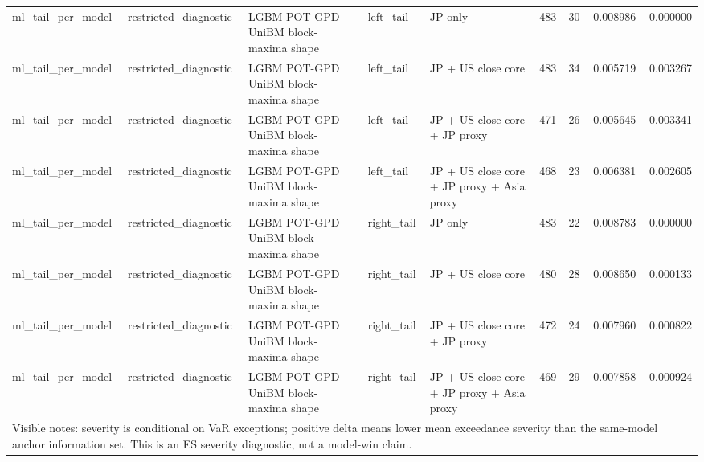 \begin{tabular}{lllllrrrr}
ml\_tail\_per\_model & restricted\_diagnostic & LGBM POT-GPD UniBM block-maxima shape & left\_tail & JP only & 483 & 30 & 0.008986 & 0.000000 \\
ml\_tail\_per\_model & restricted\_diagnostic & LGBM POT-GPD UniBM block-maxima shape & left\_tail & JP + US close core & 483 & 34 & 0.005719 & 0.003267 \\
ml\_tail\_per\_model & restricted\_diagnostic & LGBM POT-GPD UniBM block-maxima shape & left\_tail & JP + US close core + JP proxy & 471 & 26 & 0.005645 & 0.003341 \\
ml\_tail\_per\_model & restricted\_diagnostic & LGBM POT-GPD UniBM block-maxima shape & left\_tail & JP + US close core + JP proxy + Asia proxy & 468 & 23 & 0.006381 & 0.002605 \\
ml\_tail\_per\_model & restricted\_diagnostic & LGBM POT-GPD UniBM block-maxima shape & right\_tail & JP only & 483 & 22 & 0.008783 & 0.000000 \\
ml\_tail\_per\_model & restricted\_diagnostic & LGBM POT-GPD UniBM block-maxima shape & right\_tail & JP + US close core & 480 & 28 & 0.008650 & 0.000133 \\
ml\_tail\_per\_model & restricted\_diagnostic & LGBM POT-GPD UniBM block-maxima shape & right\_tail & JP + US close core + JP proxy & 472 & 24 & 0.007960 & 0.000822 \\
ml\_tail\_per\_model & restricted\_diagnostic & LGBM POT-GPD UniBM block-maxima shape & right\_tail & JP + US close core + JP proxy + Asia proxy & 469 & 29 & 0.007858 & 0.000924 \\
\midrule
\multicolumn{9}{l}{\footnotesize Visible notes: severity is conditional on VaR exceptions; positive delta means lower mean exceedance severity than the same-model anchor information set. This is an ES severity diagnostic, not a model-win claim.} \\
\bottomrule
\end{tabular}
